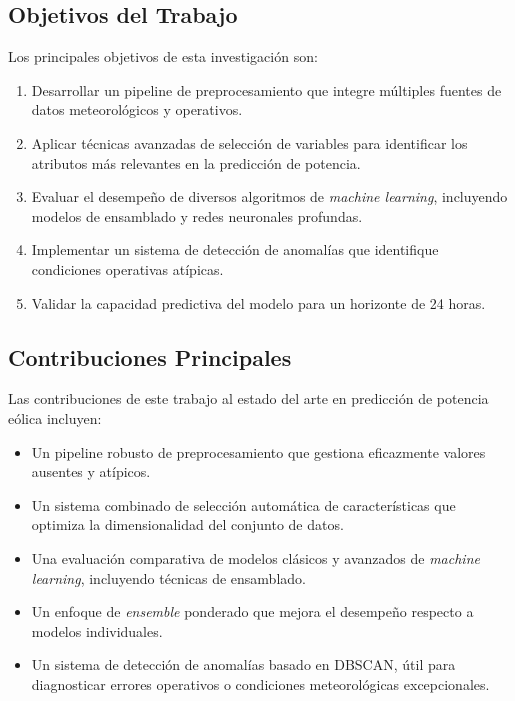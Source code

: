 \documentclass[conference]{IEEEtran}
\begin{document}
\subsection{Objetivos del Trabajo}
	
Los principales objetivos de esta investigación son:
	
\begin{enumerate}
\item Desarrollar un pipeline de preprocesamiento que integre múltiples fuentes de datos meteorológicos y operativos.

\item Aplicar técnicas avanzadas de selección de variables para identificar los atributos más relevantes en la predicción de potencia.

\item Evaluar el desempeño de diversos algoritmos de \textit{machine learning}, incluyendo modelos de ensamblado y redes neuronales profundas.

\item Implementar un sistema de detección de anomalías que identifique condiciones operativas atípicas.

\item Validar la capacidad predictiva del modelo para un horizonte de 24 horas.
\end{enumerate}
	
\subsection{Contribuciones Principales}
	
Las contribuciones de este trabajo al estado del arte en predicción de potencia eólica incluyen:
	
\begin{itemize}
\item Un pipeline robusto de preprocesamiento que gestiona eficazmente valores ausentes y atípicos.

\item Un sistema combinado de selección automática de características que optimiza la dimensionalidad del conjunto de datos.

\item Una evaluación comparativa de modelos clásicos y avanzados de \textit{machine learning}, incluyendo técnicas de ensamblado.

\item Un enfoque de \textit{ensemble} ponderado que mejora el desempeño respecto a modelos individuales.

\item Un sistema de detección de anomalías basado en DBSCAN, útil para diagnosticar errores operativos o condiciones meteorológicas excepcionales.

\end{itemize}
\end{document}
